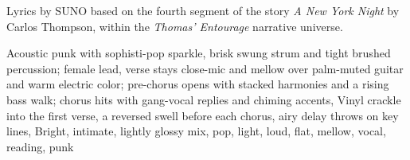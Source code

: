 
\begin{notes}
Lyrics by SUNO based on the fourth segment of the story \emph{A New York Night} by Carlos Thompson, %
within the \emph{Thomas’ Entourage} narrative universe.
\end{notes}
\begin{style}
Acoustic punk with sophisti-pop sparkle, brisk swung strum and tight brushed percussion; female lead, verse stays close-mic and mellow over palm-muted guitar and warm electric color; pre-chorus opens with stacked harmonies and a rising bass walk; chorus hits with gang-vocal replies and chiming accents, Vinyl crackle into the first verse, a reversed swell before each chorus, airy delay throws on key lines, Bright, intimate, lightly glossy mix, pop, light, loud, flat, mellow, vocal, reading, punk
\end{style}
